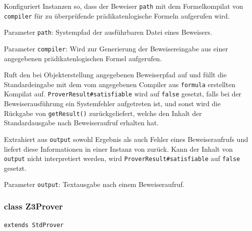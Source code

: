 \begin{description}%

    Konfiguriert Instanzen so, dass der Beweiser \texttt{path} mit dem
    Formelkompilat von \texttt{compiler} für zu überprüfende
    prädikatenlogische Formeln aufgerufen wird.%

    Parameter \texttt{path}: Systempfad der ausführbaren Datei eines
    Beweisers.%

    Parameter \texttt{compiler}: Wird zur Generierung der
    Beweisereingabe aus einer angegebenen prädikatenlogischen Formel
    aufgerufen.%


    Ruft den bei Objekterstellung angegebenen Beweiserpfad auf und
    füllt die Standardeingabe mit dem vom angegebenen Compiler aus
    \texttt{formula} erstellten Kompilat auf.
    \texttt{ProverResult\#satisfiable} wird auf \texttt{false}
    gesetzt, falls bei der Beweiserausführung ein Systemfehler
    aufgetreten ist, und sonst wird die Rückgabe von
    \texttt{getResult()} zurückgeliefert, welche den Inhalt der
    Standardausgabe nach Beweiseraufruf erhalten hat.%


    Extrahiert aus \texttt{output} sowohl Ergebnis als auch Fehler
    eines Beweiseraufrufs und liefert diese Informationen in einer
    Instanz von  zurück. Kann der Inhalt von
    \texttt{output} nicht interpretiert werden, wird
    \texttt{ProverResult\#satisfiable} auf \texttt{false} gesetzt.%

    Parameter \texttt{output}: Textausgabe nach einem Beweiseraufruf.%

\end{description}%

\subsubsection{class Z3Prover}%

\texttt{extends StdProver}%


\begin{description}%


\end{description}%


